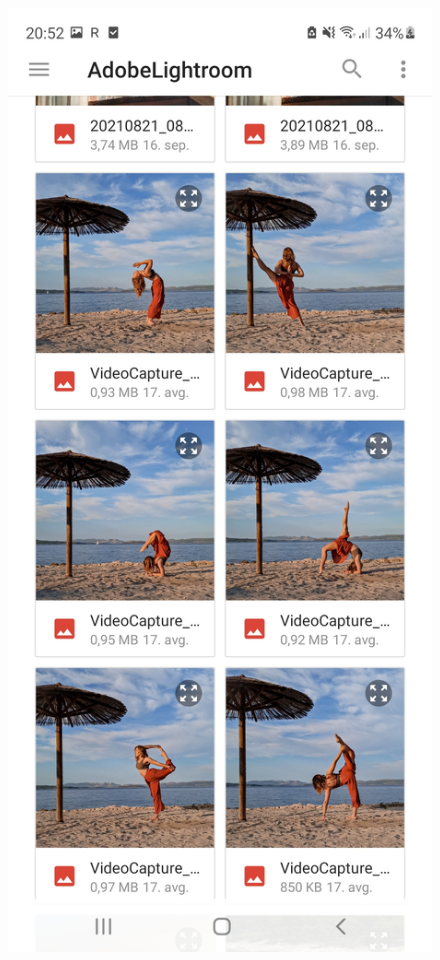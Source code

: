\documentclass[a4paper, 12pt]{book}
\begin{document}
\begin{figure}[!ht]
\centering
  \begin{minipage}[b]{0.32\textwidth}
    \includegraphics[width=\textwidth]{galerija.jpg}\centering

\end{minipage}
\end{figure}
\end{document}
